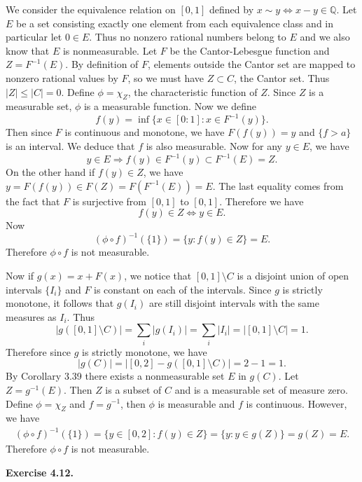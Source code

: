 \begin{exercise}{4.5}
  We consider the equivalence relation on $[0,1]$
  defined by $x\sim y\Leftrightarrow x-y\in\mathbb{Q}$.
  Let $E$ be a set consisting exactly one element from each equivalence class
  and in particular let $0\in E$.
  Thus no nonzero rational numbers belong to $E$ and we also know that $E$ is nonmeasurable.
  Let $F$ be the Cantor-Lebesgue function and $Z=F^{-1}(E)$.
  By definition of $F$, elements outside the Cantor set are mapped to nonzero rational values by $F$,
  so we must have $Z\subset C$, the Cantor set.
  Thus $|Z|\leq |C|=0.$
  Define $\phi=\chi_Z$, the characteristic function of $Z$.
  Since $Z$ is a measurable set,
  $\phi$ is a measurable function.
  Now we define \[f(y)=\inf\{x\in[0:1]:x\in F^{-1}(y)\}. \]
  Then since $F$ is continuous and monotone,
  we have $F(f(y))=y$ and $\{f>a\}$ is an interval.
  We deduce that $f$ is also measurable.
  Now for any $y\in E$, we have \[y\in E\Rightarrow f(y)\in F^{-1}(y)\subset F^{-1}(E)=Z.\]
  On the other hand if $f(y)\in Z$, we have $y=F(f(y))\in F(Z)=F(F^{-1}(E))=E$.
  The last equality comes from the fact that $F$ is surjective from $[0,1]$ to $[0,1]$.
  Therefore we have \[f(y)\in Z\Leftrightarrow y\in E.\]
  Now \[(\phi\circ f)^{-1}(\{1\})=\{y:f(y)\in Z\}=E.\]
  Therefore $\phi\circ f$ is not measurable.

  Now if $g(x)=x+F(x)$, we notice that $[0,1]\setminus C$ is a disjoint union of open intervals $\{I_i\}$
  and $F$ is constant on each of the intervals.
  Since $g$ is strictly monotone, it follows that $g(I_i)$ are still disjoint intervals with the same measures as $I_i$.
  Thus \[|g([0,1]\setminus C)|=\sum_i|g(I_i)|=\sum_i|I_i|=|[0,1]\setminus C|=1.\]
  Therefore since $g$ is strictly monotone,
  we have \[|g(C)|=|[0,2]-g([0,1]\setminus C)|=2-1=1.\]
  By Corollary 3.39 there exists a nonmeasurable set $E$ in $g(C)$.
  Let $Z=g^{-1}(E)$.
  Then $Z$ is a subset of $C$ and is a measurable set of measure zero.
  Define $\phi=\chi_Z$ and $f=g^{-1}$, then $\phi$ is measurable and $f$ is continuous.
  However, we have
  \begin{align*}
  (\phi\circ f)^{-1}(\{1\})=\{y\in[0,2]:f(y)\in Z\}=\{y:y\in g(Z)\}=g(Z)=E.
  \end{align*}
  Therefore $\phi\circ f$ is not measurable.
\end{exercise}

\noindent\textbf{Exercise 4.12. }


